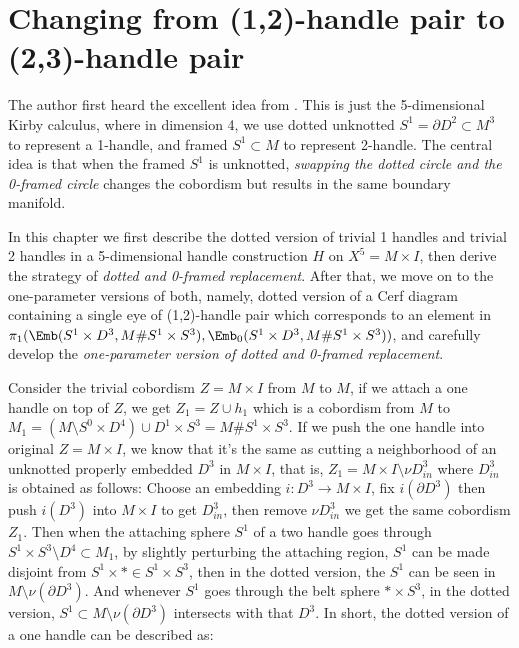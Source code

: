 \chapter{Changing from (1,2)-handle pair to (2,3)-handle pair}
\label{chap:changing-from-12-handle-pair-to-23-handle-pair}

The author first heard the excellent idea from \cite{Gay_2025}. This is just the 5-dimensional Kirby calculus, where in dimension 4, we use dotted unknotted $S^1=\partial D^2\subset M^3$ to represent a 1-handle, and framed $S^1\subset M$ to represent 2-handle. The central idea is that when the framed $S^1$ is unknotted, \emph{swapping the dotted circle and the 0-framed circle} changes the cobordism but results in the same boundary manifold. 

In this chapter we first describe the dotted version of trivial 1 handles and trivial 2 handles in a 5-dimensional handle construction $H$ on $X^5=M\times I$, then derive the strategy of \emph{dotted and 0-framed replacement}. After that, we move on to the one-parameter versions of both, namely, dotted version of a Cerf diagram containing a single eye of (1,2)-handle pair which corresponds to an element in $\pi_1(\Emb(S^1\times D^3, M\# S^1\times S^3),\Emb_0(S^1\times D^3, M\# S^1\times S^3))$, and carefully develop the \emph{one-parameter version of dotted and 0-framed replacement}.

Consider the trivial cobordism $Z=M\times I$ from $M$ to $M$, if we attach a one handle on top of $Z$, we get $Z_1=Z\cup h_1$ which is a cobordism from $M$ to $M_1=(M\setminus S^0\times D^4) \cup D^1\times S^3=M\# S^1\times S^3$. If we push the one handle into original $Z=M\times I$, we know that it's the same as cutting a neighborhood of an unknotted properly embedded $D^3$ in $M\times I$, that is, $Z_1=M\times I\setminus \nu D_{in}^3$ where $D^3_{in}$ is obtained as follows: Choose an embedding $i: D^3\to M\times I$, fix $i(\partial D^3)$ then push $i(D^3)$ into $M\times I$ to get $D_{in}^3$, then remove $\nu D_{in}^3$ we get the same cobordism $Z_1$. Then when the attaching sphere $S^1$ of a two handle goes through $S^1\times S^3\setminus D^4\subset M_1$, by slightly perturbing the attaching region, $S^1$ can be made disjoint from $S^1\times *\in S^1\times S^3$, then in the dotted version, the $S^1$ can be seen in $M\setminus \nu (\partial D^3)$. And whenever $S^1$ goes through the belt sphere $*\times S^3$, in the dotted version, $S^1\subset M\setminus \nu (\partial D^3)$ intersects with that $D^3$. In short, the dotted version of a one handle can be described as:

